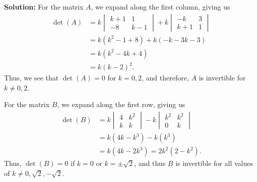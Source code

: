 \documentclass[letterpaper,12pt,reqno]{amsart}
\begin{document}
\bigskip

{\bf Solution:} For the matrix $A$, we expand along the first column, giving us
\begin{align*}
 \det(A) & = k\begin{vmatrix}k+1 & 1\\-8&k-1\end{vmatrix}+k\begin{vmatrix}-k&3\\k+1&1\end{vmatrix}\\
 & = k(k^2-1+8)+k(-k-3k-3)\\
 & = k(k^2-4k+4)\\
 & = k(k-2)^2.
\end{align*}
Thus, we see that $\det(A) = 0$ for $k=0,2$, and therefore, $A$ is invertible for $k\neq 0,2$.

\medskip

For the matrix $B$, we expand along the first row, giving us
\begin{align*}
 \det(B) & = k\begin{vmatrix}4&k^2\\k&k\end{vmatrix} - k\begin{vmatrix}k^2&k^2\\0&k\end{vmatrix}\\
 & = k(4k-k^3)-k(k^3)\\
 & = k(4k-2k^3) = 2k^2(2-k^2).
\end{align*}
Thus, $\det(B) = 0$ if $k=0$ or $k=\pm\sqrt{2}$, and thus $B$ is invertible for all values of $k\neq 0,\sqrt{2},-\sqrt{2}$.
\end{document}
